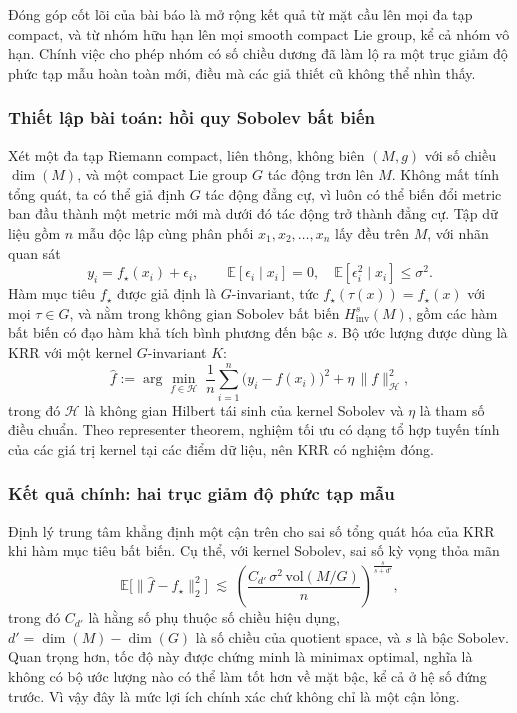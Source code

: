 Đóng góp cốt lõi của bài báo là mở rộng kết quả từ mặt cầu lên mọi đa tạp compact, và từ nhóm hữu hạn lên mọi smooth compact Lie group, kể cả nhóm vô hạn. Chính việc cho phép nhóm có số chiều dương đã làm lộ ra một trục giảm độ phức tạp mẫu hoàn toàn mới, điều mà các giả thiết cũ không thể nhìn thấy.
 
\subsubsection{Thiết lập bài toán: hồi quy Sobolev bất biến}
 
Xét một đa tạp Riemann compact, liên thông, không biên $(M, g)$ với số chiều $\dim(M)$, và một compact Lie group $G$ tác động trơn lên $M$. Không mất tính tổng quát, ta có thể giả định $G$ tác động đẳng cự, vì luôn có thể biến đổi metric ban đầu thành một metric mới mà dưới đó tác động trở thành đẳng cự. Tập dữ liệu gồm $n$ mẫu độc lập cùng phân phối $x_1, x_2, \ldots, x_n$ lấy đều trên $M$, với nhãn quan sát
\begin{equation}
    y_i = f_{\star}(x_i) + \epsilon_i, \qquad \mathbb{E}[\epsilon_i \mid x_i] = 0, \quad \mathbb{E}[\epsilon_i^2 \mid x_i] \le \sigma^2 .
\end{equation}
Hàm mục tiêu $f_{\star}$ được giả định là $G$-invariant, tức $f_{\star}(\tau(x)) = f_{\star}(x)$ với mọi $\tau \in G$, và nằm trong không gian Sobolev bất biến $H^s_{\text{inv}}(M)$, gồm các hàm bất biến có đạo hàm khả tích bình phương đến bậc $s$. Bộ ước lượng được dùng là KRR với một kernel $G$-invariant $K$:
\begin{equation}
    \hat{f} := \arg\min_{f \in \mathcal{H}} \; \frac{1}{n}\sum_{i=1}^{n}\bigl(y_i - f(x_i)\bigr)^2 + \eta \, \|f\|_{\mathcal{H}}^2 ,
\end{equation}
trong đó $\mathcal{H}$ là không gian Hilbert tái sinh của kernel Sobolev và $\eta$ là tham số điều chuẩn. Theo representer theorem, nghiệm tối ưu có dạng tổ hợp tuyến tính của các giá trị kernel tại các điểm dữ liệu, nên KRR có nghiệm đóng.
 
\subsubsection{Kết quả chính: hai trục giảm độ phức tạp mẫu}
 
Định lý trung tâm khẳng định một cận trên cho sai số tổng quát hóa của KRR khi hàm mục tiêu bất biến. Cụ thể, với kernel Sobolev, sai số kỳ vọng thỏa mãn
\begin{equation}
    \mathbb{E}\bigl[\|\hat{f} - f_{\star}\|_2^2\bigr] \;\lesssim\; \left( \frac{C_{d'}\, \sigma^2\, \mathrm{vol}(M/G)}{n} \right)^{\frac{s}{s+d'}},
\end{equation}
trong đó $C_{d'}$ là hằng số phụ thuộc số chiều hiệu dụng, $d' = \dim(M) - \dim(G)$ là số chiều của quotient space, và $s$ là bậc Sobolev. Quan trọng hơn, tốc độ này được chứng minh là minimax optimal, nghĩa là không có bộ ước lượng nào có thể làm tốt hơn về mặt bậc, kể cả ở hệ số đứng trước. Vì vậy đây là mức lợi ích chính xác chứ không chỉ là một cận lỏng.
 
